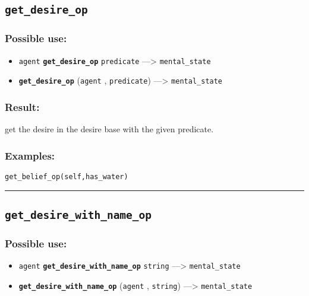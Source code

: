 \documentclass[]{book}
\providecommand{\tightlist}{%
  \setlength{\itemsep}{0pt}\setlength{\parskip}{0pt}}
\theoremstyle{definition}
\theoremstyle{definition}
\theoremstyle{definition}
\theoremstyle{remark}
\begin{document}
\subsection{\texorpdfstring{\texttt{get\_desire\_op}}{get\_desire\_op}}\label{get_desire_op}

\subsubsection{Possible use:}\label{possible-use-203}

\begin{itemize}
\tightlist
\item
  \texttt{agent} \textbf{\texttt{get\_desire\_op}} \texttt{predicate}
  ---\textgreater{} \texttt{mental\_state}
\item
  \textbf{\texttt{get\_desire\_op}} (\texttt{agent} ,
  \texttt{predicate}) ---\textgreater{} \texttt{mental\_state}
\end{itemize}

\subsubsection{Result:}\label{result-197}

get the desire in the desire base with the given predicate.

\subsubsection{Examples:}\label{examples-150}

\begin{verbatim}
get_belief_op(self,has_water) 
\end{verbatim}

\begin{center}\rule{0.5\linewidth}{\linethickness}\end{center}

\subsection{\texorpdfstring{\texttt{get\_desire\_with\_name\_op}}{get\_desire\_with\_name\_op}}\label{get_desire_with_name_op}

\subsubsection{Possible use:}\label{possible-use-204}

\begin{itemize}
\tightlist
\item
  \texttt{agent} \textbf{\texttt{get\_desire\_with\_name\_op}}
  \texttt{string} ---\textgreater{} \texttt{mental\_state}
\item
  \textbf{\texttt{get\_desire\_with\_name\_op}} (\texttt{agent} ,
  \texttt{string}) ---\textgreater{} \texttt{mental\_state}
\end{itemize}
\end{document}
